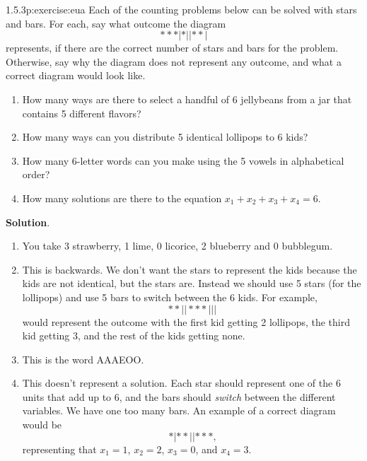 \documentclass[twoside,11pt,]{book}
\newcommand{\blocktitlefont}{\relax}
\numberwithin{equation}{chapter}
\begin{document}
\begin{divisionsolution}{1.5.3}{}{p:exercise:eua}%
Each of the counting problems below can be solved with stars and bars. For each, say what outcome the diagram%
\begin{equation*}
***|*||**|
\end{equation*}
represents, if there are the correct number of stars and bars for the problem. Otherwise, say why the diagram does not represent any outcome, and what a correct diagram would look like.%
\begin{enumerate}[label=(\alph*)]
\item{}How many ways are there to select a handful of 6 jellybeans from a jar that contains 5 different flavors?%
\item{}How many ways can you distribute 5 identical lollipops to 6 kids?%
\item{}How many 6-letter words can you make using the 5 vowels in alphabetical order?%
\item{}How many solutions are there to the equation \(x_1 + x_2 + x_3 + x_4 = 6\).%
\end{enumerate}
%
\par\smallskip%
\noindent\textbf{\blocktitlefont Solution}.\quad{}%
\begin{enumerate}[label=(\alph*)]
\item{}You take 3 strawberry, 1 lime, 0 licorice, 2 blueberry and 0 bubblegum.%
\item{}This is backwards. We don't want the stars to represent the kids because the kids are not identical, but the stars are. Instead we should use 5 stars (for the lollipops) and use 5 bars to switch between the 6 kids. For example,%
\begin{equation*}
**||***|||
\end{equation*}
would represent the outcome with the first kid getting 2 lollipops, the third kid getting 3, and the rest of the kids getting none.%
\item{}This is the word AAAEOO.%
\item{}This doesn't represent a solution. Each star should represent one of the 6 units that add up to 6, and the bars should \emph{switch} between the different variables. We have one too many bars. An example of a correct diagram would be%
\begin{equation*}
*|**||***\text{,}
\end{equation*}
representing that \(x_1 = 1\), \(x_2 = 2\), \(x_3 = 0\), and \(x_4 = 3\).%
\end{enumerate}
%
\end{divisionsolution}%
\end{document}
